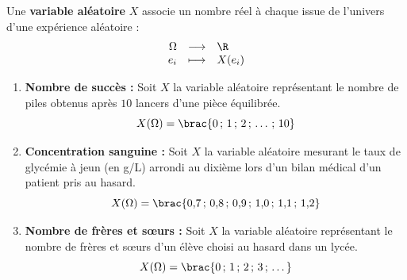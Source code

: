 \begin{defin}
	Une \textbf{variable aléatoire} $X$ associe un nombre réel à chaque issue de l'univers d'une expérience aléatoire :
	\[
		\begin{array}{rcl}
			\Omega & \longrightarrow & \R     \\
			e_i    & \longmapsto     & X(e_i)
		\end{array}
	\]
\end{defin}

\begin{ex}
	\nline
	\begin{enumerate}
		\item \textbf{Nombre de succès :} Soit $X$ la variable aléatoire représentant le nombre de piles obtenus après $10$ lancers d'une pièce équilibrée.
		      \[
			      X(\Omega) = \brac{0\,;\,1\,;\,2\,;\,\dots\,;\,10}
		      \]
		\item \textbf{Concentration sanguine :} Soit $X$ la variable aléatoire mesurant le taux de glycémie à jeun (en g/L) arrondi au dixième lors d'un bilan médical d'un patient pris au hasard.
		      \[
			      X(\Omega) = \brac{0{,}7\,;\,0{,}8\,;\,0{,}9\,;\,1{,}0\,;\,1{,}1\,;\,1{,}2}
		      \]
		\item \textbf{Nombre de frères et sœurs :} Soit $X$ la variable aléatoire représentant le nombre de frères et sœurs d'un élève choisi au hasard dans un lycée.
		      \[
			      X(\Omega) = \brac{0\,;\,1\,;\,2\,;\,3\,;\,\dots}
		      \]
	\end{enumerate}
\end{ex}

